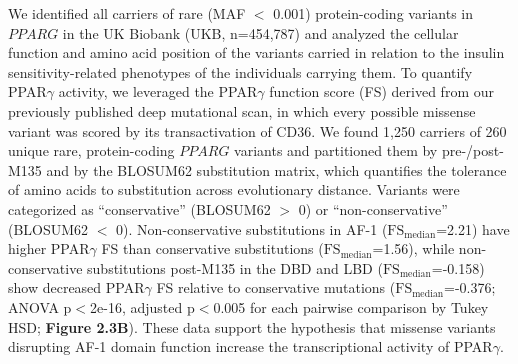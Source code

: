 We identified all carriers of rare (MAF $<$ 0.001) protein-coding variants in \(PPARG\) in the UK Biobank (UKB, n=454,787)\cite{Backman2021-kd} and analyzed the cellular function and amino acid position of the variants carried in relation to the insulin sensitivity-related phenotypes of the individuals carrying them. To quantify PPAR$\gamma$ activity, we leveraged the PPAR$\gamma$ function score (FS) derived from our previously published deep mutational scan, in which every possible missense variant was scored by its transactivation of CD36\cite{Majithia2016-bm}. We found 1,250 carriers of 260 unique rare, protein-coding \(PPARG\) variants and partitioned them by pre-/post- M135 and by the BLOSUM62 substitution matrix, which quantifies the tolerance of amino acids to substitution across evolutionary distance\cite{Henikoff1992-jo}. Variants were categorized as “conservative” (BLOSUM62 $>$ 0) or “non-conservative” (BLOSUM62 $<$ 0). Non-conservative substitutions in AF-1 ($\mathrm{FS}_{\mathrm{median}}$=2.21) have higher PPAR$\gamma$ FS than conservative substitutions ($\mathrm{FS}_{\mathrm{median}}$=1.56), while non-conservative substitutions post-M135 in the DBD and LBD ($\mathrm{FS}_{\mathrm{median}}$=-0.158) show decreased PPAR$\gamma$ FS relative to conservative mutations ($\mathrm{FS}_{\mathrm{median}}$=-0.376; ANOVA p$<$2e-16, adjusted p$<$0.005 for each pairwise comparison by Tukey HSD; \textbf{Figure 2.3B}). These data support the hypothesis that missense variants disrupting AF-1 domain function increase the transcriptional activity of PPAR$\gamma$.

